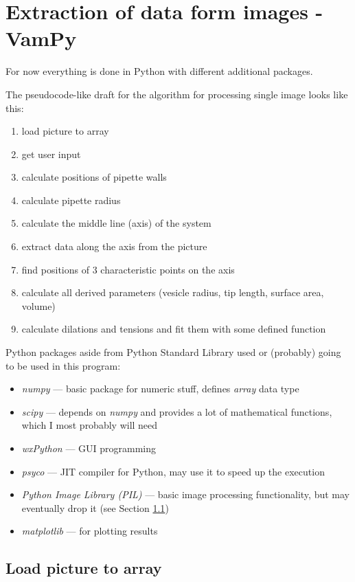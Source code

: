 \section{Extraction of data form images - VamPy}\label{data}

For now everything is done in Python with different additional packages.

The pseudocode-like draft for the algorithm for processing single image looks like this:
\begin{enumerate}
  \item load picture to array
  \item get user input
  \item calculate positions of pipette walls
  \item calculate pipette radius
  \item calculate the middle line (axis) of the system
  \item extract data along the axis from the picture
  \item find positions of 3 characteristic points on the axis
  \item calculate all derived parameters (vesicle radius, tip length, surface area, volume)
  \item calculate dilations and tensions and fit them with some defined function
\end{enumerate}

Python packages aside from Python Standard Library used or (probably) going to be used in this program:
\begin{itemize}
	\item \emph{numpy} --- basic package for numeric stuff, defines \emph{array} data type
	\item \emph{scipy} --- depends on \emph{numpy} and provides a lot of mathematical functions, which I most probably will need \cite{scipy}
	\item \emph{wxPython} --- GUI programming
	\item \emph{psyco} --- JIT compiler for Python, may use it to speed up the execution
	\item \emph{Python Image Library (PIL)} --- basic image processing functionality, but may eventually drop it (see Section \ref{loadpic})
	\item \emph{matplotlib} --- for plotting results
\end{itemize}

\subsection{Load picture to array}\label{loadpic}

